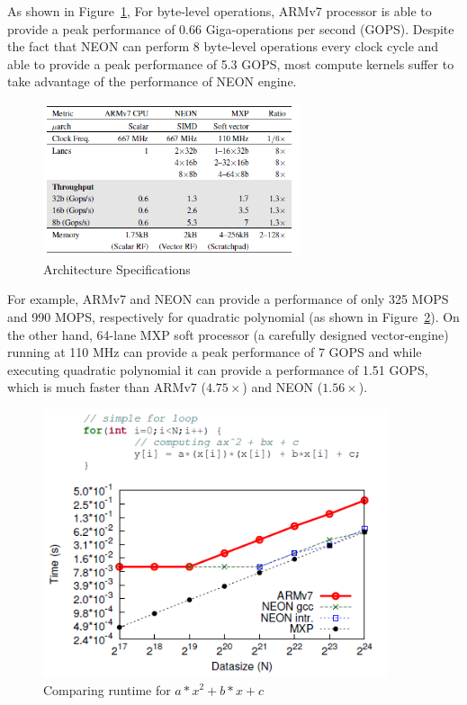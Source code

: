 As shown in Figure~\ref{table-arm-neon-mxp}, For byte-level operations, ARMv7 processor is able to provide a peak performance of 0.66 Giga-operations per second (GOPS).
Despite the fact that NEON can perform 8 byte-level operations every clock cycle and able to provide a peak performance of 5.3 GOPS, most compute kernels suffer to take advantage of the performance of NEON engine. 

\begin{figure}
	\centering
	\includegraphics[width=0.67\textwidth]{images/table-arm-neon-mxp.png}
	\caption{Architecture Specifications~\cite{kapre2016optimizing}}
	\label{table-arm-neon-mxp}
\end{figure}



For example, ARMv7 and NEON can provide a performance of only 325 MOPS and 990 MOPS, respectively for quadratic polynomial (as shown in Figure~\ref{quad-poly}). On the other hand, 64-lane MXP soft processor (a carefully designed vector-engine) running at 110 MHz can provide a peak performance of 7 GOPS and while executing quadratic polynomial it can provide a performance of 1.51 GOPS, which is much faster than ARMv7 ($4.75\times$) and NEON ($1.56\times$).





\begin{figure}
	\centering
	\includegraphics[width=0.9\textwidth]{images/quad-poly.png}
	\caption{Comparing runtime for $a*x^2 + b*x + c$~\cite{kapre2016optimizing}}
	\label{quad-poly}
\end{figure}


